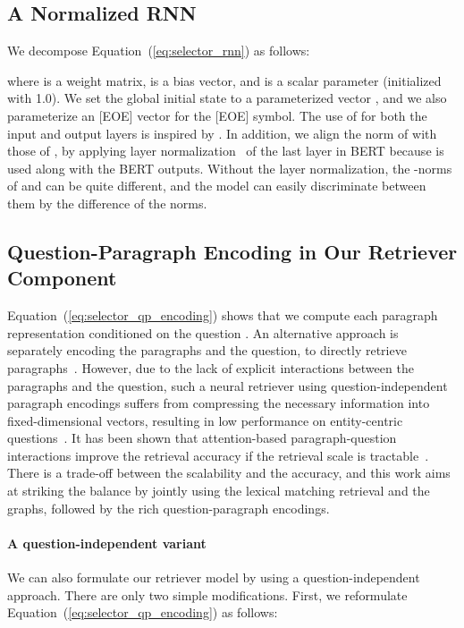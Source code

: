 \documentclass{article} \usepackage{iclr2020_conference,times}
\begin{document}
\subsection{A Normalized RNN}
\label{subsec:normalized_rnn}
We  decompose Equation~(\ref{eq:selector_rnn}) as follows:

where  is a weight matrix,  is a bias vector, and  is a scalar parameter (initialized with 1.0).
We set the global initial state  to a parameterized vector , and we also parameterize an [EOE] vector  for the [EOE] symbol.
The use of  for both the input and output layers is inspired by \citet{tai_softmax,tai_softmax_2}.
In addition, we align the norm of  with those of , by applying layer normalization~\citep{Ba2016LayerN} of the last layer in BERT because  is used along with the BERT outputs.
Without the layer normalization, the -norms of  and  can be quite different, and the model can easily discriminate between them by the difference of the norms.

\subsection{Question-Paragraph Encoding in Our Retriever Component}
\label{subsec:appendix_qp-encoding}

Equation~(\ref{eq:selector_qp_encoding}) shows that we compute each paragraph representation  conditioned on the question .
An alternative approach is separately encoding the paragraphs and the question, to directly retrieve paragraphs~\citep{lee-chang-toutanova:2019:ACL2019,denspi,das2019multi}. 
However,
due to the lack of explicit interactions between the paragraphs and the question, such a neural retriever using question-independent paragraph encodings suffers from compressing the necessary information into fixed-dimensional vectors, resulting in low performance on entity-centric questions~\citep{lee-chang-toutanova:2019:ACL2019}.
It has been shown that attention-based paragraph-question interactions improve the retrieval accuracy if the retrieval scale is tractable~\citep{wang2018r,lee2018ranking}.
There is a trade-off between the scalability and the accuracy, and this work aims at striking the balance by jointly using the lexical matching retrieval and the graphs, followed by the rich question-paragraph encodings.

\paragraph{A question-independent variant}
We can also formulate our retriever model by using a question-independent approach.
There are only two simple modifications.
First, we reformulate Equation~(\ref{eq:selector_qp_encoding}) as follows:
\end{document}
